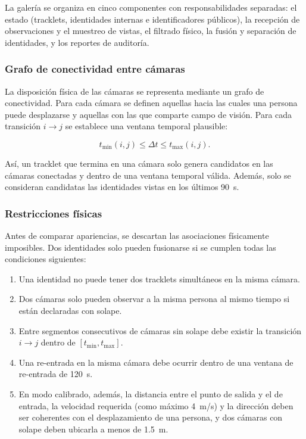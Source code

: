 \documentclass[12pt,a4paper]{article}
\begin{document}
La galería se organiza en cinco componentes con responsabilidades
separadas: el estado (tracklets, identidades internas e identificadores
públicos), la recepción de observaciones y el muestreo de vistas, el
filtrado físico, la fusión y separación de identidades, y los reportes
de auditoría.

\subsubsection{Grafo de conectividad entre cámaras}

La disposición física de las cámaras se representa mediante un grafo de
conectividad. Para cada cámara se definen aquellas hacia las cuales una
persona puede desplazarse y aquellas con las que comparte campo de
visión. Para cada transición $i\rightarrow j$ se establece una ventana
temporal plausible:

\begin{equation}
t_{\min}(i,j)
\leq
\Delta t
\leq
t_{\max}(i,j).
\end{equation}

Así, un tracklet que termina en una cámara solo genera candidatos en las
cámaras conectadas y dentro de una ventana temporal válida. Además, solo
se consideran candidatas las identidades vistas en los últimos 90~s.

\subsubsection{Restricciones físicas}

Antes de comparar apariencias, se descartan las asociaciones físicamente
imposibles. Dos identidades solo pueden fusionarse si se cumplen todas
las condiciones siguientes:

\begin{enumerate}
    \item Una identidad no puede tener dos tracklets simultáneos en la
    misma cámara.
    \item Dos cámaras solo pueden observar a la misma persona al mismo
    tiempo si están declaradas con solape.
    \item Entre segmentos consecutivos de cámaras sin solape debe existir
    la transición $i\rightarrow j$ dentro de $[t_{\min},t_{\max}]$.
    \item Una re-entrada en la misma cámara debe ocurrir dentro de una
    ventana de re-entrada de 120~s.
    \item En modo calibrado, además, la distancia entre el punto de
    salida y el de entrada, la velocidad requerida (como máximo
    4~m/s) y la dirección deben ser coherentes con el desplazamiento de
    una persona, y dos cámaras con solape deben ubicarla a menos de
    1.5~m.
\end{enumerate}
\end{document}
